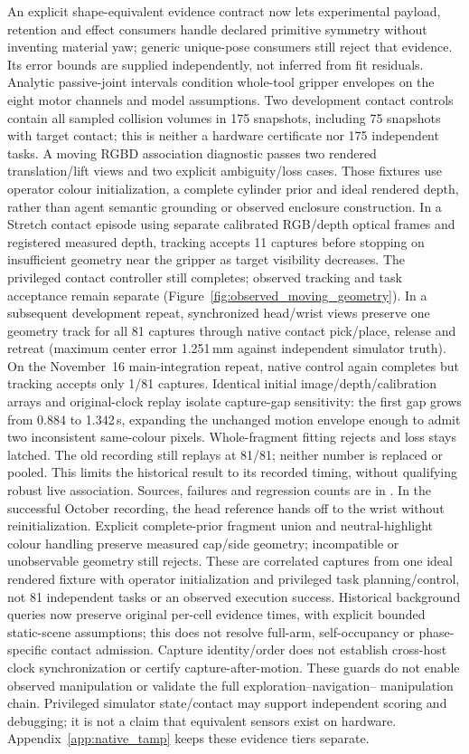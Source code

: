 An explicit shape-equivalent evidence contract now lets experimental payload,
retention and effect consumers handle declared primitive symmetry without
inventing material yaw; generic unique-pose consumers still reject that evidence.
Its error bounds are supplied independently, not inferred from fit residuals.
Analytic passive-joint intervals condition whole-tool gripper envelopes on the
eight motor channels and model assumptions. Two development contact controls
contain all sampled collision volumes in 175 snapshots, including 75 snapshots
with target contact; this is neither a hardware certificate nor 175 independent
tasks. A moving RGBD association diagnostic passes two rendered translation/lift
views and two explicit ambiguity/loss cases. Those fixtures use operator colour
initialization, a complete cylinder prior and ideal rendered depth, rather than
agent semantic grounding or observed enclosure construction.
In a Stretch contact episode using separate calibrated RGB/depth optical frames
and registered measured depth, tracking accepts 11 captures before stopping on
insufficient geometry near the gripper as target visibility decreases.
The privileged contact controller still completes; observed tracking and task
acceptance remain separate (Figure~\ref{fig:observed_moving_geometry}).
In a subsequent development repeat, synchronized head/wrist views preserve one
geometry track for all 81 captures through native contact pick/place, release
and retreat (maximum center error 1.251\,mm against independent simulator truth).
On the November~16 main-integration repeat, native control again completes but
tracking accepts only 1/81 captures. Identical initial image/depth/calibration
arrays and original-clock replay isolate capture-gap sensitivity: the first gap
grows from 0.884 to 1.342\,s, expanding the unchanged motion envelope enough to
admit two inconsistent same-colour pixels. Whole-fragment fitting rejects and
loss stays latched. The old recording still replays at 81/81; neither number is
replaced or pooled. This limits the historical result to its recorded timing,
without qualifying robust live association. Sources, failures and regression
counts are in .
In the successful October recording, the head reference hands off to the wrist
without reinitialization. Explicit
complete-prior fragment union and neutral-highlight colour handling preserve
measured cap/side geometry; incompatible or unobservable geometry still rejects.
These are correlated captures from one ideal rendered fixture with operator
initialization and privileged task planning/control, not 81 independent tasks
or an observed execution success. Historical background queries now preserve
original per-cell evidence times, with explicit bounded static-scene assumptions;
this does not resolve full-arm, self-occupancy or phase-specific contact admission.
Capture identity/order does not establish
cross-host clock synchronization or certify capture-after-motion. These guards
do not enable observed manipulation or validate the full exploration--navigation--
manipulation chain. Privileged simulator state/contact may support independent
scoring and debugging; it is not a claim that equivalent sensors exist on
hardware. Appendix~\ref{app:native_tamp} keeps these evidence tiers separate.

